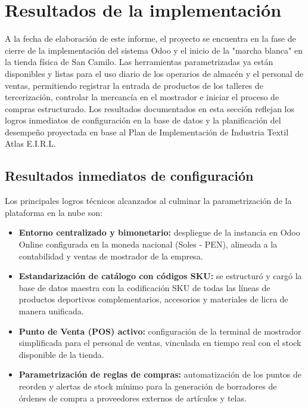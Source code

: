 \section{Resultados de la implementación}
\begin{indentedsubsection}
A la fecha de elaboración de este informe, el proyecto se encuentra en la fase de cierre de la implementación del sistema Odoo y el inicio de la "marcha blanca" en la tienda física de San Camilo. Las herramientas parametrizadas ya están disponibles y listas para el uso diario de los operarios de almacén y el personal de ventas, permitiendo registrar la entrada de productos de los talleres de tercerización, controlar la mercancía en el mostrador e iniciar el proceso de compras estructurado. Los resultados documentados en esta sección reflejan los logros inmediatos de configuración en la base de datos y la planificación del desempeño proyectada en base al Plan de Implementación de Industria Textil Atlas E.I.R.L.
\end{indentedsubsection}

\subsection{Resultados inmediatos de configuración}
\begin{indentedsubsection}
Los principales logros técnicos alcanzados al culminar la parametrización de la plataforma en la nube son:
\begin{itemize}
    \item \textbf{Entorno centralizado y bimonetario:} despliegue de la instancia en Odoo Online configurada en la moneda nacional (Soles - PEN), alineada a la contabilidad y ventas de mostrador de la empresa.
    \item \textbf{Estandarización de catálogo con códigos SKU:} se estructuró y cargó la base de datos maestra con la codificación SKU de todas las líneas de productos deportivos complementarios, accesorios y materiales de licra de manera unificada.
    \item \textbf{Punto de Venta (POS) activo:} configuración de la terminal de mostrador simplificada para el personal de ventas, vinculada en tiempo real con el stock disponible de la tienda.
    \item \textbf{Parametrización de reglas de compras:} automatización de los puntos de reorden y alertas de stock mínimo para la generación de borradores de órdenes de compra a proveedores externos de artículos y telas.
\end{itemize}
\end{indentedsubsection}

